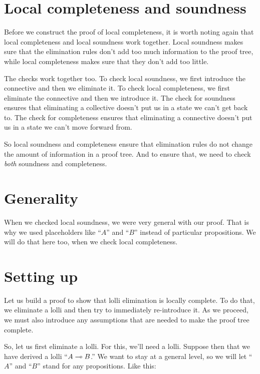 \documentclass[../../../main.tex]{subfiles}
\begin{document}
\section{Local completeness and soundness}

Before we construct the proof of local completeness, it is worth noting again that local completeness and local soundness work together. Local soundness makes sure that the elimination rules don't add too much information to the proof tree, while local completeness makes sure that they don't add too little.

The checks work together too. To check local soundness, we first introduce the connective and then we eliminate it. To check local completeness, we first eliminate the connective and then we introduce it. The check for soundness ensures that eliminating a collective doesn't put us in a state we can't get back to. The check for completeness ensures that eliminating a connective doesn't put us in a state we can't move forward from.

So local soundness and completeness ensure that elimination rules do not change the amount of information in a proof tree. And to ensure that, we need to check \emph{both} soundness and completeness.


\section{Generality}

When we checked local soundness, we were very general with our proof. That is why we used placeholders like ``$A$'' and ``$B$'' instead of particular propositions. We will do that here too, when we check local completeness.


\section{Setting up}

Let us build a proof to show that lolli elimination is locally complete. To do that, we eliminate a lolli and then try to immediately re-introduce it. As we proceed, we must also introduce any assumptions that are needed to make the proof tree complete. 

So, let us first eliminate a lolli. For this, we'll need a lolli. Suppose then that we have derived a lolli ``$A \lolli/ B$.'' We want to stay at a general level, so we will let ``$A$'' and ``$B$'' stand for any propositions. Like this:
\end{document}
